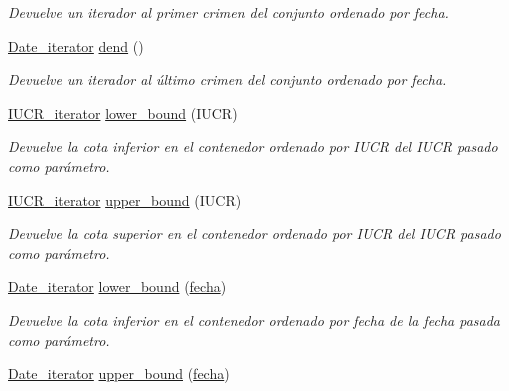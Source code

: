 \begin{DoxyCompactItemize}
\begin{DoxyCompactList}\small\item\em Devuelve un iterador al primer crimen del conjunto ordenado por fecha. \end{DoxyCompactList}\item 
\hypertarget{classCSS_afae6d5cc1cfb20d98a236759ccb4789a}{}\hyperlink{classCSS_1_1Date__iterator}{Date\+\_\+iterator} \hyperlink{classCSS_afae6d5cc1cfb20d98a236759ccb4789a}{dend} ()\label{classCSS_afae6d5cc1cfb20d98a236759ccb4789a}

\begin{DoxyCompactList}\small\item\em Devuelve un iterador al último crimen del conjunto ordenado por fecha. \end{DoxyCompactList}\item 
\hypertarget{classCSS_a79878f2415e70ccbb9835a2e5d08d56c}{}\hyperlink{classCSS_1_1IUCR__iterator}{I\+U\+C\+R\+\_\+iterator} \hyperlink{classCSS_a79878f2415e70ccbb9835a2e5d08d56c}{lower\+\_\+bound} (I\+U\+C\+R)\label{classCSS_a79878f2415e70ccbb9835a2e5d08d56c}

\begin{DoxyCompactList}\small\item\em Devuelve la cota inferior en el contenedor ordenado por I\+U\+C\+R del I\+U\+C\+R pasado como parámetro. \end{DoxyCompactList}\item 
\hypertarget{classCSS_ae17a18cad335da7ca1f057545b82d6e6}{}\hyperlink{classCSS_1_1IUCR__iterator}{I\+U\+C\+R\+\_\+iterator} \hyperlink{classCSS_ae17a18cad335da7ca1f057545b82d6e6}{upper\+\_\+bound} (I\+U\+C\+R)\label{classCSS_ae17a18cad335da7ca1f057545b82d6e6}

\begin{DoxyCompactList}\small\item\em Devuelve la cota superior en el contenedor ordenado por I\+U\+C\+R del I\+U\+C\+R pasado como parámetro. \end{DoxyCompactList}\item 
\hypertarget{classCSS_a3acb2d31ffc82cf81f4b1a9efd166ab7}{}\hyperlink{classCSS_1_1Date__iterator}{Date\+\_\+iterator} \hyperlink{classCSS_a3acb2d31ffc82cf81f4b1a9efd166ab7}{lower\+\_\+bound} (\hyperlink{classfecha}{fecha})\label{classCSS_a3acb2d31ffc82cf81f4b1a9efd166ab7}

\begin{DoxyCompactList}\small\item\em Devuelve la cota inferior en el contenedor ordenado por fecha de la fecha pasada como parámetro. \end{DoxyCompactList}\item 
\hypertarget{classCSS_a8fe67eaee0bcd9f723637120d194f7fb}{}\hyperlink{classCSS_1_1Date__iterator}{Date\+\_\+iterator} \hyperlink{classCSS_a8fe67eaee0bcd9f723637120d194f7fb}{upper\+\_\+bound} (\hyperlink{classfecha}{fecha})\label{classCSS_a8fe67eaee0bcd9f723637120d194f7fb}


\end{DoxyCompactItemize}
